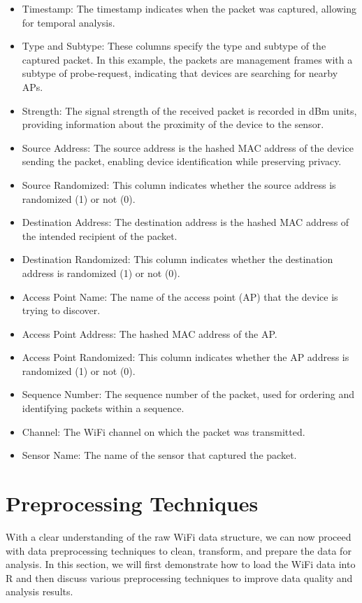\documentclass[
  letterpaper,
]{scrbook}
\providecommand{\tightlist}{%
  \setlength{\itemsep}{0pt}\setlength{\parskip}{0pt}}\usepackage{longtable,booktabs,array}
\begin{document}
\begin{itemize}
\tightlist
\item
  Timestamp: The timestamp indicates when the packet was captured,
  allowing for temporal analysis.
\item
  Type and Subtype: These columns specify the type and subtype of the
  captured packet. In this example, the packets are management frames
  with a subtype of probe-request, indicating that devices are searching
  for nearby APs.
\item
  Strength: The signal strength of the received packet is recorded in
  dBm units, providing information about the proximity of the device to
  the sensor.
\item
  Source Address: The source address is the hashed MAC address of the
  device sending the packet, enabling device identification while
  preserving privacy.
\item
  Source Randomized: This column indicates whether the source address is
  randomized (1) or not (0).
\item
  Destination Address: The destination address is the hashed MAC address
  of the intended recipient of the packet.
\item
  Destination Randomized: This column indicates whether the destination
  address is randomized (1) or not (0).
\item
  Access Point Name: The name of the access point (AP) that the device
  is trying to discover.
\item
  Access Point Address: The hashed MAC address of the AP.
\item
  Access Point Randomized: This column indicates whether the AP address
  is randomized (1) or not (0).
\item
  Sequence Number: The sequence number of the packet, used for ordering
  and identifying packets within a sequence.
\item
  Channel: The WiFi channel on which the packet was transmitted.
\item
  Sensor Name: The name of the sensor that captured the packet.
\end{itemize}

\hypertarget{preprocessing-techniques}{%
\chapter{Preprocessing Techniques}\label{preprocessing-techniques}}

With a clear understanding of the raw WiFi data structure, we can now
proceed with data preprocessing techniques to clean, transform, and
prepare the data for analysis. In this section, we will first
demonstrate how to load the WiFi data into R and then discuss various
preprocessing techniques to improve data quality and analysis results.
\end{document}
